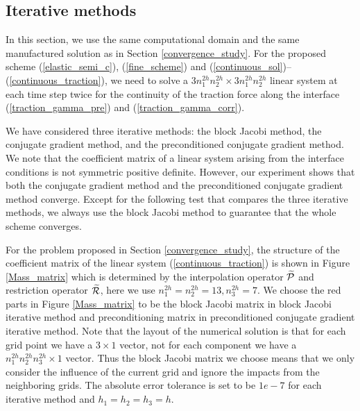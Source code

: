 \subsection{Iterative methods}\label{iterative_section}
In this section, we use the same computational domain and the same manufactured solution as in Section \ref{convergence_study}. For the proposed scheme (\ref{elastic_semi_c}), (\ref{fine_scheme}) and (\ref{continuous_sol})--(\ref{continuous_traction}), we need to solve a $3n_1^{2h}n_2^{2h}\times 3n_1^{2h}n_2^{2h}$ linear system at each time step twice for the continuity of the traction force along the interface (\ref{traction_gamma_pre}) and (\ref{traction_gamma_corr}). %

We have considered three iterative methods: the block Jacobi method, the conjugate gradient method, and the preconditioned conjugate gradient method. We note that the coefficient matrix of a linear system arising from the interface conditions is not symmetric positive definite. However, our experiment shows that both the conjugate gradient method and the preconditioned conjugate gradient method converge. Except for the following test that compares the three iterative methods, we always use the block Jacobi method to guarantee that the whole scheme converges. 

For the problem proposed in Section \ref{convergence_study}, the structure of the coefficient matrix of the linear system (\ref{continuous_traction}) is shown in Figure \ref{Mass_matrix} which is determined by the interpolation operator $\widetilde{\mathcal{P}}$ and restriction operator $\widetilde{\mathcal{R}}$, here we use $n_1^{2h} = n_2^{2h}=13, n_3^{2h} = 7$. We choose the red parts in Figure \ref{Mass_matrix} to be the block Jacobi matrix in block Jacobi iterative method and preconditioning matrix in preconditioned conjugate gradient iterative method. Note that the layout of the numerical solution is that for each grid point we have a $3\times1$ vector, not for each component we have a $n_1^{2h}n_2^{2h}n_3^{2h}\times1$ vector.  Thus the block Jacobi matrix we choose means that we only consider the influence of the current grid and ignore the impacts from the neighboring grids. The absolute error tolerance is set to be $1e-7$ for each iterative method and $h_1 = h_2 = h_3 = h$.

